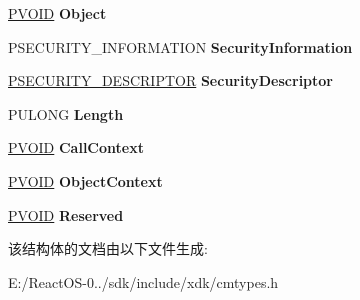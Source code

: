 \begin{DoxyCompactItemize}
\item 
\mbox{\label{struct___r_e_g___q_u_e_r_y___k_e_y___s_e_c_u_r_i_t_y___i_n_f_o_r_m_a_t_i_o_n_a176ec29a870d1ed8c7979d7934190e61}} 
\hyperlink{interfacevoid}{P\+V\+O\+ID} {\bfseries Object}
\item 
\mbox{\label{struct___r_e_g___q_u_e_r_y___k_e_y___s_e_c_u_r_i_t_y___i_n_f_o_r_m_a_t_i_o_n_a37cef1c9503c2661bad659993e3bbf39}} 
P\+S\+E\+C\+U\+R\+I\+T\+Y\+\_\+\+I\+N\+F\+O\+R\+M\+A\+T\+I\+ON {\bfseries Security\+Information}
\item 
\mbox{\label{struct___r_e_g___q_u_e_r_y___k_e_y___s_e_c_u_r_i_t_y___i_n_f_o_r_m_a_t_i_o_n_aafbbe66e2977004a4ebbce3c98cc5b90}} 
\hyperlink{struct___s_e_c_u_r_i_t_y___d_e_s_c_r_i_p_t_o_r}{P\+S\+E\+C\+U\+R\+I\+T\+Y\+\_\+\+D\+E\+S\+C\+R\+I\+P\+T\+OR} {\bfseries Security\+Descriptor}
\item 
\mbox{\label{struct___r_e_g___q_u_e_r_y___k_e_y___s_e_c_u_r_i_t_y___i_n_f_o_r_m_a_t_i_o_n_a33c8599c89bb60b0a0efa42883d72f04}} 
P\+U\+L\+O\+NG {\bfseries Length}
\item 
\mbox{\label{struct___r_e_g___q_u_e_r_y___k_e_y___s_e_c_u_r_i_t_y___i_n_f_o_r_m_a_t_i_o_n_a1613f993136714faac7d333da8efb7f7}} 
\hyperlink{interfacevoid}{P\+V\+O\+ID} {\bfseries Call\+Context}
\item 
\mbox{\label{struct___r_e_g___q_u_e_r_y___k_e_y___s_e_c_u_r_i_t_y___i_n_f_o_r_m_a_t_i_o_n_a9c5fbf1e4ccbd0e7cd5df9278fbb130f}} 
\hyperlink{interfacevoid}{P\+V\+O\+ID} {\bfseries Object\+Context}
\item 
\mbox{\label{struct___r_e_g___q_u_e_r_y___k_e_y___s_e_c_u_r_i_t_y___i_n_f_o_r_m_a_t_i_o_n_ad116bc1c884e26ea81fadd614a99f5ab}} 
\hyperlink{interfacevoid}{P\+V\+O\+ID} {\bfseries Reserved}
\end{DoxyCompactItemize}


该结构体的文档由以下文件生成\+:\begin{DoxyCompactItemize}
\item 
E\+:/\+React\+O\+S-\/0../sdk/include/xdk/cmtypes.\+h\end{DoxyCompactItemize}
